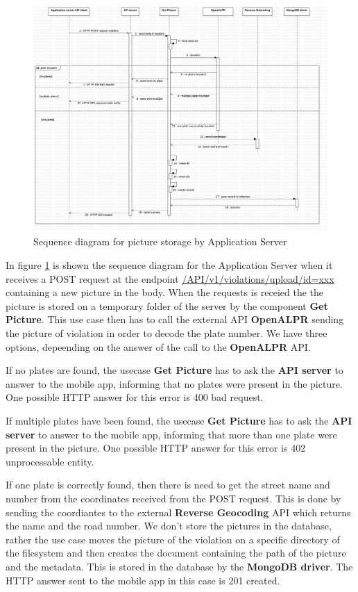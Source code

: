 \begin{figure}[H]
\centering
\includegraphics[width=\textwidth]{Images/DDSeqSeverPic.png}
\caption{\label{fig:DDSeqSeverPic} Sequence diagram for picture storage by Application Server}
\end{figure}
In figure \ref{fig:DDSeqSeverPic} is shown the sequence diagram for the Application Server when it receives a POST request at the endpoint \url{/API/v1/violations/upload/id=xxx} containing a new picture in the body. When the requests is receied the the picture is stored on a temporary folder of the server by the component \textbf{Get Picture}. This use case then has to call the external API \textbf{OpenALPR} sending the picture of violation in order to decode the plate number. We have three options, depeending on the answer of the call to the \textbf{OpenALPR} API.

If no plates are found, the usecase \textbf{Get Picture} has to ask the \textbf{API server} to answer to the mobile app, informing that no plates were present in the picture. One possible HTTP answer for this error is \textcolor{poliblue}{400 bad request}.

If multiple plates have been found, the usecase \textbf{Get Picture} has to ask the \textbf{API server} to answer to the mobile app, informing that more than one plate were present in the picture. One possible HTTP answer for this error is \textcolor{poliblue}{402 unprocessable entity}.

If one plate is correctly found, then there is need to get the street name and number from the coordinates received from the POST request. This is done by sending the coordiantes to the external \textbf{Reverse Geocoding} API which returns the name and the road number.
We don't store the pictures in the database, rather the use case moves the picture of the violation on a specific directory of the filesystem and then creates the document containing the path of the picture and the metadata. This is stored in the database by the \textbf{MongoDB driver}. The HTTP answer sent to the mobile app in this case is \textcolor{poliblue}{201 created}.

